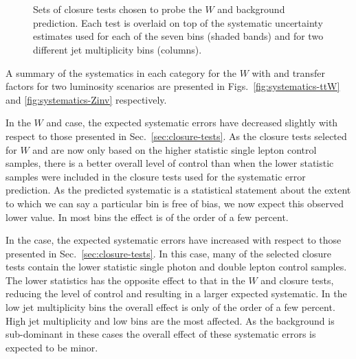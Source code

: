 \begin{figure}[h!]
  \begin{center}
     \\
     ~~
     \\
    \caption{Sets of closure tests chosen to probe the $W$ and \ttbar
      background prediction. Each test is overlaid on top of
      the systematic uncertainty estimates used for each of the seven
      \scalht bins (shaded bands) and for two different jet
      multiplicity bins (columns).}
    \label{fig:ZinvClosure}
  \end{center} 
\end{figure}

A summary of the systematics in each category for the $W$ with \ttbar 
and \znunu transfer factors for two luminosity scenarios are presented in
Figs.~\ref{fig:systematics-ttW} and \ref{fig:systematics-Zinv}
respectively. 

In the $W$ and \ttbar case, the expected systematic errors have decreased 
slightly with respect to those presented in
Sec.~\ref{sec:closure-tests}. As the
closure tests selected for $W$ and \ttbar are now only based on the higher
statistic single lepton control samples, there is a better overall level of
control than when the lower statistic samples were included in the
closure tests used for the systematic error prediction. As the
predicted systematic is a statistical statement about the
extent to which we can say a particular bin is free of bias, we now 
expect this observed lower value. In most bins the
effect is of the order of a few percent.

In the \znunu case, the expected systematic errors have increased with
respect to those presented in Sec.~\ref{sec:closure-tests}. In
this case, many of the selected closure tests contain the lower
statistic single photon and double lepton control samples. The lower
statistics has the opposite effect to that in the $W$ and \ttbar closure 
tests, reducing the level of control and resulting in a larger
expected systematic. In the low jet multiplicity bins the overall
effect is only of the order of a few percent. High jet multiplicity
and low \scalht bins are the most affected. As the \znunu
background is sub-dominant in these cases the overall effect of these
systematic errors is expected to be minor.

